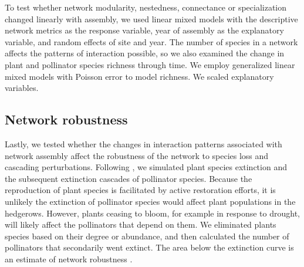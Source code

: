 \documentclass[12pt]{article}
\begin{document}
To test whether network modularity, nestedness, connectance or
specialization changed linearly with assembly, we used linear mixed
models with the descriptive network metrics as the response variable,
year of assembly as the explanatory variable, and random effects of
site and year. The number of species in a network affects the patterns
of interaction possible, so we also examined the change in plant and
pollinator species richness through time. We employ generalized linear
mixed models with Poisson error to model richness. We scaled
explanatory variables.


\subsection*{Network robustness}
Lastly, we tested whether the changes in interaction patterns
associated with network assembly affect the robustness of the network
to species loss and cascading perturbations. Following
\cite{Memmott2004}, we simulated plant species extinction and the
subsequent extinction cascades of pollinator species. Because the
reproduction of plant species is facilitated by active restoration
efforts, it is unlikely the extinction of pollinator species would
affect plant populations in the hedgerows. However, plants ceasing to
bloom, for example in response to drought, will likely affect the
pollinators that depend on them. We eliminated plants species based on
their degree or abundance, and then calculated the number of
pollinators that secondarily went extinct. The area below the
extinction curve is an estimate of network robustness
\citep{Memmott2004, bipartite}.
\end{document}
